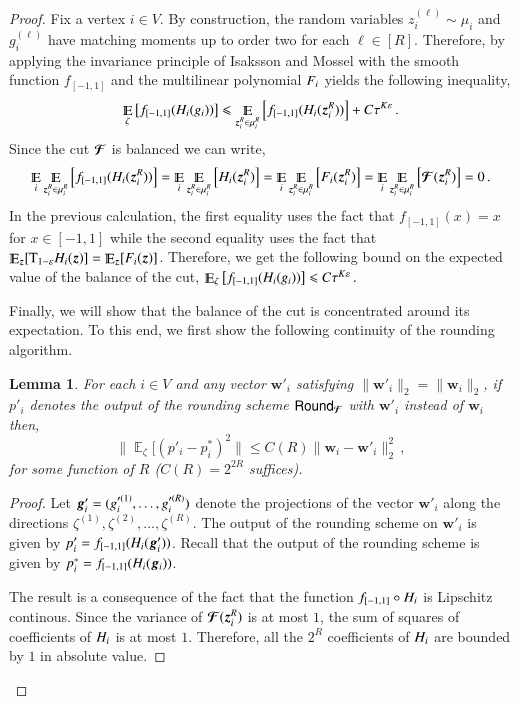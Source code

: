 \documentclass[11pt]{article}
\newtheorem{lemma}[theorem]{Lemma}
\theoremstyle{definition}
\newcommand{\norm}[1]{\lVert#1\rVert}
\newcommand{\Esymb}{\mathbb{E}}
\DeclareMathOperator*{\E}{\Esymb}
\renewcommand{\vec}[1]{{\bm{#1}}}
\newcommand{\mper}{\,.}
\newcommand{\mcom}{\,,}
\renewcommand{\leq}{\leqslant}
\let\epsilon=\varepsilon
\numberwithin{equation}{section}
\newcommand{\eps}{\epsilon}
\newcommand{\mrv}[1]{\bm{\lowercase{#1}}}
\newcommand{\mrf}[1]{\bm{\mathcal{\uppercase{#1}}}}
\newcommand{\opl}[1]{{\uppercase{#1}}}
\newcommand{\msf}[1]{\mathsf{#1}}
\newcommand{\round}{\msf{Round}}
\newcommand{\struncate}{f_{[-1,1]}}
\newcommand{\T}{\mathrm{T}}
\begin{document}
\begin{proof}
Fix a vertex $i \in V$. By construction, the random variables
$z^{(\ell)}_i \sim \mu_i$ and $g^{(\ell)}_i$ have
matching moments up to order two for each $\ell \in [R]$.  Therefore, by applying the invariance
principle of Isaksson and Mossel \cite{IsakssonM09} with the smooth
function $\struncate$ and the multilinear polynomial $\opl{F}_i$ yields
the following inequality,
$$ \E_{\zeta} \left[
\struncate(\opl{H}_i(g_{i}))  \right] \leq  \E_{\mrv{z}^R_i \in
\mu_i^R} \left[\struncate(\opl{H}_i(\mrv{z}_i^R)) \right] +
C\tau^{K\eps} \mper$$
Since the cut $\mrf{F}$ is balanced we can write,
$$ \E_{i} \E_{\mrv{z}^R_i \in \mu_i^R}
\left[\struncate(\opl{H}_i(\mrv{z}_i^R)) \right] =  \E_{i}
\E_{\mrv{z}_i^R \in \mu_i^R}
\left[\opl{H}_i(\mrv{z}_i^R) \right] = \E_{i} \E_{\mrv{z}_i^R \in \mu_i^R}
\left[\opl{F}_i(\mrv{z}_i^R) \right] = \E_{i} \E_{\mrv{z}_i^R \in
\mu_i^R} \left[\mrf{F}(\mrv{z}_i^R) \right] =
0 \mper$$
In the previous calculation, the first equality uses the fact that $\struncate(x) = x$ for $x \in
[-1,1]$ while the second equality uses the fact that
$\E_{\mrv{z}}[\T_{1-\epsilon} H_i(\mrv{z})] = \E_{\mrv{z}}[F_i(\mrv{z})]$.
Therefore, we get the following bound on the expected value of the
balance of the cut, $ \E_{\zeta} \left[
\struncate(\opl{H}_i(g_{i}))  \right] \leq  C\tau^{K\eps} \mper$


Finally, we will show that the balance of the cut is concentrated
around its expectation.  To this end, we first show the following
continuity of the rounding algorithm.

\begin{lemma} \label{lem:rounding-cont}
	For each $i \in V$ and any vector $\vec w'_i$ satisfying
	$\norm{\vec w'_i}_2 = \norm{\vec w_i}_2$, if $p'_i$ denotes the output
	of the rounding scheme $\round_{\mrf{F}}$ with $\vec w'_i$ instead
	of $\vec w_i$ then,
$$ \| \E_{\zeta}[(p'_i-p^*_i)^2 \| \leq C(R) \norm{\vec w_i - \vec w'_i}^2_2 \mcom$$
for some function of $R$ ($C(R) = 2^{2R}$ suffices).
\end{lemma}
\begin{proof}
	Let $\mrv{g}'_i = (g'^{(1)}_i,\ldots,g'^{(R)}_i)$ denote the projections of the vector $\vec w'_i$ along
the directions $\zeta^{(1)},\zeta^{(2)},\ldots,\zeta^{(R)}$.  The
output of the rounding scheme on $\vec w'_i$ is given by
$p'_i = \struncate(\opl{H}_i(\mrv{g}'_i))$.  Recall that the output of the rounding scheme is given by $p^*_i =
\struncate(\opl{H}_i(\mrv{g}_i))$.

The result is a consequence of the fact that the function
$\struncate\circ \opl{H}_i$ is Lipschitz continous.  Since the
variance of $\mrf{F}(\mrv{z}_i^R)$ is at most $1$, the sum of squares
of coefficients of $\opl{H}_i$ is at most $1$.  Therefore, all the
$2^R$ coefficients of $\opl{H}_i$ are bounded by $1$ in absolute value.


\end{proof}
\end{proof}
\end{document}
